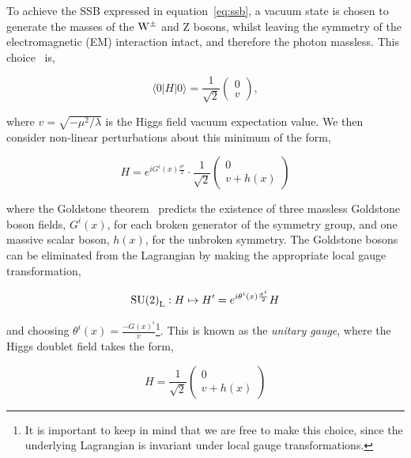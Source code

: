 \noindent
To achieve the SSB expressed in equation~\ref{eq:ssb}, a vacuum state is chosen to generate the masses of the ${\rm{W}}^\pm$ and Z bosons, whilst leaving the symmetry of the electromagnetic (EM) interaction intact, and therefore the photon massless. This choice~\cite{Weinberg:1967tq} is,

\begin{equation}
    \langle 0 | H | 0 \rangle = \frac{1}{\sqrt{2}}\begin{pmatrix}
    0 \\
    v
    \end{pmatrix},
\end{equation}

\noindent
where $v=\sqrt{-\mu^2/\lambda}$ is the Higgs field vacuum expectation value. We then consider non-linear perturbations about this minimum of the form,

\begin{equation}
    H = e^{iG^i(x)\frac{\sigma^i}{2}} \cdot \frac{1}{\sqrt{2}}\begin{pmatrix}
    0 \\
    v + h(x)
    \end{pmatrix}
\end{equation}

\noindent
where the Goldstone theorem~\cite{Goldstone:1962es} predicts the existence of three massless Goldstone boson fields, $G^i(x)$, for each broken generator of the symmetry group, and one massive scalar boson, $h(x)$, for the unbroken symmetry. The Goldstone bosons can be eliminated from the Lagrangian by making the appropriate local gauge transformation,

\begin{equation}
    {\rm{SU}(2)}_{\rm{L}}: H \mapsto H' = e^{i\theta^i(x)\frac{\sigma^i}{2}}H
\end{equation}

\noindent
and choosing $\theta^i(x)=\frac{-G(x)^i}{v}$\footnote{It is important to keep in mind that we are free to make this choice, since the underlying Lagrangian is invariant under local gauge transformations.}. This is known as the \textit{unitary gauge}, where the Higgs doublet field takes the form,

\begin{equation}
    H = \frac{1}{\sqrt{2}}\begin{pmatrix}
    0 \\
    v + h(x)
    \end{pmatrix}
\end{equation}

